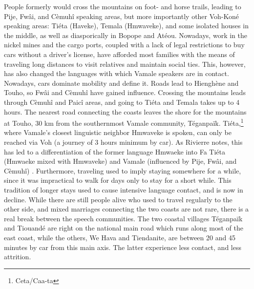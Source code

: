  People formerly would cross the mountains on foot- and horse trails, leading to Pije, Fwâi, and Cèmuhî speaking areas, but more importantly other Voh-Koné speaking areas: Tiéta (Haveke), Temala (Hmwaveke), and some isolated houses in the middle, as well as diasporically in Bopope and Atéou. Nowadays, work in the nickel mines and the cargo ports, coupled with a lack of legal restrictions to buy cars without a driver's license, %
 have afforded most families with the means of traveling long distances to visit relatives and maintain social ties. This, however, has also changed the languages with which Vamale speakers are in contact. Nowadays, cars dominate mobility and define it. Roads lead to Hienghène and Touho, so Fwâi and Cèmuhî have gained influence. Crossing the mountains leads through Cèmuhî and Paicî areas, and going to Tiéta and Temala takes up to 4 hours. %
 The nearest road connecting the coasts leaves the shore for the mountains at Touho, 30 km from the southernmost Vamale community, Téganpaïk. Tiéta,\footnote{Ceta/Caa-ta } where Vamale's closest linguistic neighbor Hmwaveke is spoken, can only be reached via Voh (a journey of 3 hours minimum by car). As Rivierre notes, this has led to a differentiation of the former language Hmwaeke into Fa Tiéta (Hmwaeke mixed with Hmwaveke) and Vamale (influenced by Pije, Fwâi, and Cèmuhî)  \parencite[14]{rivierre_bwatoo_2006}. %
 Furthermore, traveling used to imply staying somewhere for a while, since it was impractical to walk for days only to stay for a short while. This tradition of longer stays used to cause intensive language contact, and is now in decline. While there are still people alive who used to travel regularly to the other side, and mixed marriages connecting the two coasts are not rare, there is a real break between the speech communities. %
 The two coastal villages Téganpaïk and Tiouandé are right on the national main road which runs along most of the east coast, while the others, We Hava and Tiendanite, are between 20 and 45 minutes by car from this main axis. The latter experience less contact, and less attrition.
 
